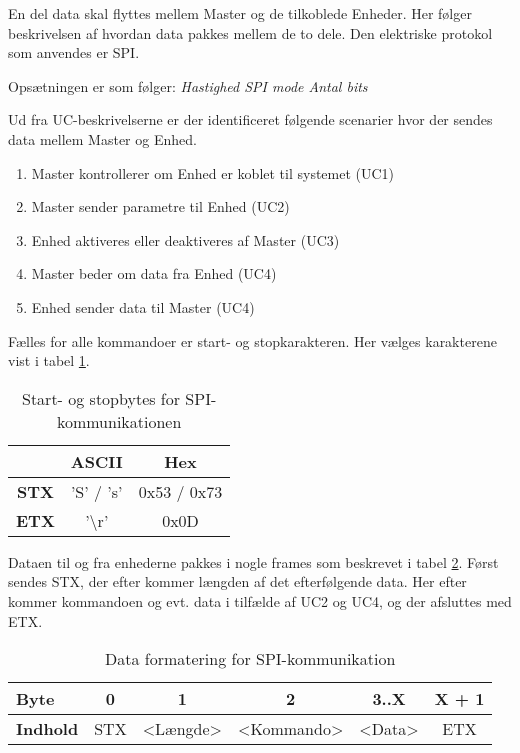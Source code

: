 
En del data skal flyttes mellem Master og de tilkoblede Enheder. Her følger beskrivelsen af hvordan data pakkes mellem de to dele. Den elektriske protokol som anvendes er SPI.

Opsætningen er som følger:
\textit{Hastighed
SPI mode
Antal bits}

Ud fra UC-beskrivelserne er der identificeret følgende scenarier hvor der sendes data mellem Master og Enhed.

\begin{enumerate}
	\item Master kontrollerer om Enhed er koblet til systemet (UC1)
	\item Master sender parametre til Enhed (UC2)
	\item Enhed aktiveres eller deaktiveres af Master (UC3)
	\item Master beder om data fra Enhed (UC4)
	\item Enhed sender data til Master (UC4)
\end{enumerate}

Fælles for alle kommandoer er start- og stopkarakteren. Her vælges karakterene vist i tabel \ref{table:SWProtokol-char}.

\begin{table}[h]
	\caption{Start- og stopbytes for SPI-kommunikationen}
	\centering
	\begin{tabular}{|c|c|c|}
		\hline 
		& \textbf{ASCII} & \textbf{Hex} \\ 
		\hline 
		\textbf{STX} & 'S' / 's' & 0x53 / 0x73 \\ 
		\hline 
		\textbf{ETX} & '\textbackslash r' & 0x0D \\ 
		\hline 
	\end{tabular} 
	\label{table:SWProtokol-char}
\end{table}

Dataen til og fra enhederne pakkes i nogle frames som beskrevet i tabel \ref{table:SWProtokol-frames}. Først sendes STX, der efter kommer længden af det efterfølgende data. Her efter kommer kommandoen og evt. data i tilfælde af UC2 og UC4, og der afsluttes med ETX.

\begin{table}[h]
	\caption{Data formatering for SPI-kommunikation}
	\centering
	\begin{tabular}{|l|c|c|c|c|c|}
		\hline 
		\textbf{Byte} & 0 & 1 & 2 & 3..X & X + 1 \\ 
		\hline 
		\textbf{Indhold} & STX & <Længde> & <Kommando> & <Data> & ETX \\ 
		\hline 
	\end{tabular} 
	\label{table:SWProtokol-frames}
\end{table}

